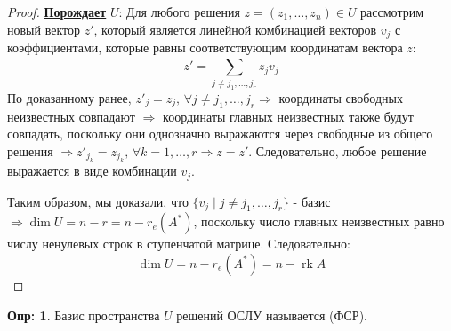 \documentclass[12pt]{article}
\theoremstyle{definition}
\newtheorem{defn}{Опр:}
\DeclareMathOperator{\rk}{\text{rk}}
\newcommand{\ddsum}[2]{\displaystyle\sum\limits_{#1}^{#2}}
\begin{document}
\begin{proof}
	\uline{\textbf{Порождает}} $U$: Для любого решения $z = (z_1, \dotsc, z_n) \in U$ рассмотрим новый вектор $z'$, который является линейной комбинацией векторов $v_j$ с коэффициентами, которые равны соответствующим координатам вектора $z$: 
	$$
		z' = \ddsum{j \neq j_1, \dotsc, j_r}{}z_jv_j
	$$
	По доказанному ранее, $z'_j = z_j, \, \forall j \neq j_1, \dotsc, j_r \Rightarrow$ координаты свободных неизвестных совпадают $\Rightarrow$ координаты главных неизвестных также будут совпадать, поскольку они однозначно выражаются через свободные из общего решения $\Rightarrow z'_{j_k} = z_{j_k}, \, \forall k = 1,\dotsc,r \Rightarrow z = z'$. Следовательно, любое решение выражается в виде комбинации $v_j$.
	
	Таким образом, мы доказали, что $\{v_j \mid j \neq j_1 ,\dotsc, j_r\}$ - базис $\Rightarrow \dim{U} = n -r = n - r_e(A^*)$, поскольку число главных неизвестных равно числу ненулевых строк в ступенчатой матрице. Следовательно:
	$$
		\dim{U} = n - r_e(A^*) = n - \rk{A}
	$$
\end{proof}

\begin{defn}
	Базис пространства $U$ решений ОСЛУ называется  (ФСР). 
\end{defn}
\end{document}
